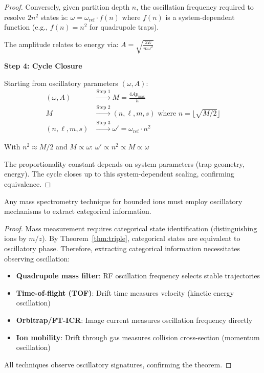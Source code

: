 \begin{proof}
Conversely, given partition depth $n$, the oscillation frequency required to resolve $2n^2$ states is:
$
\omega = \omega_{\mathrm{ref}} \cdot f(n)
$
where $f(n)$ is a system-dependent function (e.g., $f(n) = n^2$ for quadrupole traps).

The amplitude relates to energy via:
$
A = \sqrt{\frac{2E}{m\omega^2}}
$

\textbf{Step 4: Cycle Closure}

Starting from oscillatory parameters $(\omega, A)$:
\begin{align*}
(\omega, A) &\xrightarrow{\text{Step 1}} M = \frac{4Ap_{\max}}{h} \\
M &\xrightarrow{\text{Step 2}} (n, \ell, m, s) \text{ where } n = \lfloor\sqrt{M/2}\rfloor \\
(n, \ell, m, s) &\xrightarrow{\text{Step 3}} \omega' = \omega_{\mathrm{ref}} \cdot n^2
\end{align*}

With $n^2 \approx M/2$ and $M \propto \omega$:
$
\omega' \propto n^2 \propto M \propto \omega
$

The proportionality constant depends on system parameters (trap geometry, energy). The cycle closes up to this system-dependent scaling, confirming equivalence.
\end{proof}

\begin{corollary}
\label{cor:oscillation}
Any mass spectrometry technique for bounded ions must employ oscillatory mechanisms to extract categorical information.
\end{corollary}

\begin{proof}
Mass measurement requires categorical state identification (distinguishing ions by $m/z$). By Theorem~\ref{thm:triple}, categorical states are equivalent to oscillatory phase. Therefore, extracting categorical information necessitates observing oscillation:
\begin{itemize}
    \item \textbf{Quadrupole mass filter}: RF oscillation frequency selects stable trajectories
    \item \textbf{Time-of-flight (TOF)}: Drift time measures velocity (kinetic energy oscillation)
    \item \textbf{Orbitrap/FT-ICR}: Image current measures oscillation frequency directly
    \item \textbf{Ion mobility}: Drift through gas measures collision cross-section (momentum oscillation)
\end{itemize}
All techniques observe oscillatory signatures, confirming the theorem.
\end{proof}

